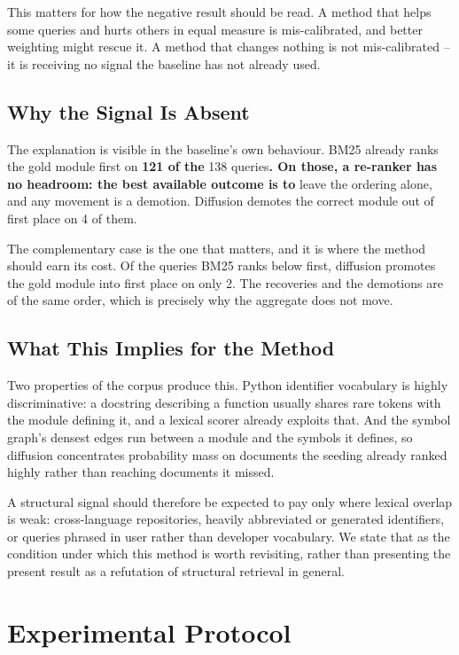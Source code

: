 \documentclass[10pt,twocolumn,letterpaper]{article}
\begin{document}
This matters for how the negative result should be read. A method that helps some
queries and hurts others in equal measure is mis-calibrated, and better weighting
might rescue it. A method that changes nothing is not mis-calibrated -- it is
receiving no signal the baseline has not already used.


\subsection{Why the Signal Is Absent}


The explanation is visible in the baseline's own behaviour. BM25 already ranks the
gold module first on \textbf{121 of the}
138
queries\textbf{. On those, a re-ranker has no headroom: the best available outcome is to}
leave the ordering alone, and any movement is a demotion. Diffusion demotes the
correct module out of first place on 4 of
them.

The complementary case is the one that matters, and it is where the method should
earn its cost. Of the queries BM25 ranks below first, diffusion promotes the gold
module into first place on only 2. The
recoveries and the demotions are of the same order, which is precisely why the
aggregate does not move.


\subsection{What This Implies for the Method}


Two properties of the corpus produce this. Python identifier vocabulary is highly
discriminative: a docstring describing a function usually shares rare tokens with
the module defining it, and a lexical scorer already exploits that. And the symbol
graph's densest edges run between a module and the symbols it defines, so diffusion
concentrates probability mass on documents the seeding already ranked highly rather
than reaching documents it missed.

A structural signal should therefore be expected to pay only where lexical overlap
is weak: cross-language repositories, heavily abbreviated or generated identifiers,
or queries phrased in user rather than developer vocabulary. We state that as the
condition under which this method is worth revisiting, rather than presenting the
present result as a refutation of structural retrieval in general.




\section{Experimental Protocol}
\end{document}
